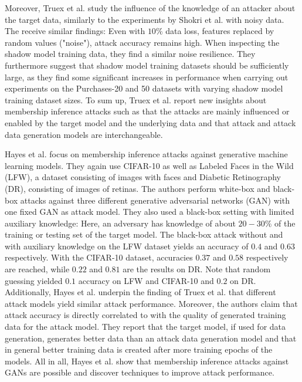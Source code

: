 \documentclass[runningheads]{llncs}
\begin{document}
Moreover, Truex et al. study the influence of the knowledge of an attacker about the target data, similarly to the experiments by Shokri et al. with noisy data. The receive similar findings: Even with $10\%$ data loss, features replaced by random values ("noise"), attack accuracy remains high. When inspecting the shadow model training data, they find a similar noise resilience. They furthermore suggest that shadow model training datasets should be sufficiently large, as they find some significant increases in performance when carrying out experiments on the Purchases-20 and 50 datasets with varying shadow model training dataset sizes.
To sum up, Truex et al. report new insights about membership inference attacks such as that the attacks are mainly influenced or enabled by the target model and the underlying data and that attack and attack data generation models are interchangeable.
\par
Hayes et al. \cite{hayes2017logan} focus on membership inference attacks against generative machine learning models. They again use CIFAR-10 as well as Labeled Faces in the Wild (LFW), a dataset consisting of images with faces and Diabetic Retinography (DR), consisting of images of retinas. The authors perform white-box and black-box attacks against three different generative adversarial networks (GAN) with one fixed GAN as attack model. They also used a black-box setting with limited auxiliary knowledge: Here, an adversary has knowledge of about $20-30\%$ of the training or testing set of the target model. The black-box attack without and with auxiliary knowledge on the LFW dataset yields an accuracy of $0.4$ and $0.63$ respectively. With the CIFAR-10 dataset, accuracies $0.37$ and $0.58$ respectively are reached, while $0.22$ and $0.81$ are the results on DR. Note that random guessing yielded $0.1$ accuracy on LFW and CIFAR-10 and $0.2$ on DR. Additionally, Hayes et al. \cite{hayes2017logan} underpin the finding of Truex et al. \cite{truex2018towards} that different attack models yield similar attack performance.
Moreover, the authors claim that attack accuracy is directly correlated to with the quality of generated training data for the attack model. They report that the target model, if used for data generation, generates better data than an attack data generation model and that in general better training data is created after more training epochs of the models.
All in all, Hayes et al. show that membership inference attacks against GANs are possible and discover techniques to improve attack performance.
\par
\end{document}
